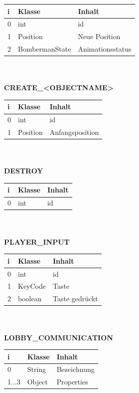 \documentclass[11pt]{scrartcl}
\begin{document}
\begin{tabularx}{\linewidth}{l l l}
\textbf{i} & \textbf{Klasse} & \textbf{Inhalt}\\
\hline
0 & int & id\\
1 & Position & Neue Position\\
2 & BombermanState & Animationsstatus\\
\end{tabularx}\\\\

\textbf{CREATE\_<OBJECTNAME>}\\

\begin{tabularx}{\linewidth}{l l l}
\textbf{i} & \textbf{Klasse} & \textbf{Inhalt}\\
\hline
0 & int & id\\
1 & Position & Anfangsposition\\
\end{tabularx}\\\\

\textbf{DESTROY}\\

\begin{tabularx}{\linewidth}{l l l}
\textbf{i} & \textbf{Klasse} & \textbf{Inhalt}\\
\hline
0 & int & id\\
\end{tabularx}\\\\

\textbf{PLAYER\_INPUT}\\

\begin{tabularx}{\linewidth}{l l l}
\textbf{i} & \textbf{Klasse} & \textbf{Inhalt}\\
\hline
0 & int & id\\
1 & KeyCode & Taste\\
2 & boolean & Taste gedrückt\\
\end{tabularx}\\\\

\textbf{LOBBY\_COMMUNICATION}\\

\begin{tabularx}{\linewidth}{l l l}
	\textbf{i} & \textbf{Klasse} & \textbf{Inhalt}\\
	\hline
	0 & String & Bezeichnung\\
	1...3 & Object & Properties\\
\end{tabularx}\\\\
\end{document}
